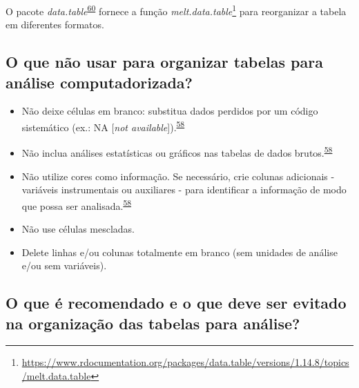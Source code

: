 \documentclass[
]{book}
\renewcommand{\href}[2]{#2\footnote{\url{#1}}}
\newenvironment{infobox}[1]
  {
  \begin{itemize}
  \renewcommand{\labelitemi}{
    \raisebox{-.7\height}[0pt][0pt]{
      {\setkeys{Gin}{width=3em,keepaspectratio}
        \texttt{[image: \#1]}}
    }
  }
  \setlength{\fboxsep}{1em}
  \begin{blackbox}
  \item
  }
  {
  \end{blackbox}
  \end{itemize}
  }
\begin{document}
\begin{infobox}{images/Rlogo}
O pacote \emph{data.table}\textsuperscript{\protect\hyperlink{ref-data.table}{60}} fornece a função \href{https://www.rdocumentation.org/packages/data.table/versions/1.14.8/topics/melt.data.table}{\emph{melt.data.table}} para reorganizar a tabela em diferentes formatos.

\end{infobox}

\hypertarget{o-que-nuxe3o-usar-para-organizar-tabelas-para-anuxe1lise-computadorizada}{%
\subsection{O que não usar para organizar tabelas para análise computadorizada?}\label{o-que-nuxe3o-usar-para-organizar-tabelas-para-anuxe1lise-computadorizada}}

\begin{itemize}
\item
  Não deixe células em branco: substitua dados perdidos por um código sistemático (ex.: NA {[}\emph{not available}{]}).\textsuperscript{\protect\hyperlink{ref-broman2018}{58}}
\item
  Não inclua análises estatísticas ou gráficos nas tabelas de dados brutos.\textsuperscript{\protect\hyperlink{ref-broman2018}{58}}
\item
  Não utilize cores como informação. Se necessário, crie colunas adicionais - variáveis instrumentais ou auxiliares - para identificar a informação de modo que possa ser analisada.\textsuperscript{\protect\hyperlink{ref-broman2018}{58}}
\item
  Não use células mescladas.
\item
  Delete linhas e/ou colunas totalmente em branco (sem unidades de análise e/ou sem variáveis).
\end{itemize}

\hypertarget{o-que-uxe9-recomendado-e-o-que-deve-ser-evitado-na-organizauxe7uxe3o-das-tabelas-para-anuxe1lise}{%
\subsection{O que é recomendado e o que deve ser evitado na organização das tabelas para análise?}\label{o-que-uxe9-recomendado-e-o-que-deve-ser-evitado-na-organizauxe7uxe3o-das-tabelas-para-anuxe1lise}}
\end{document}
